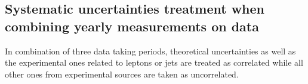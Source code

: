 \subsection{Systematic uncertainties treatment when combining yearly measurements on data}

In combination of three data taking periods, theoretical uncertainties as well as the experimental ones related to leptons or jets are treated as correlated while all other ones from experimental sources are taken as uncorrelated.

